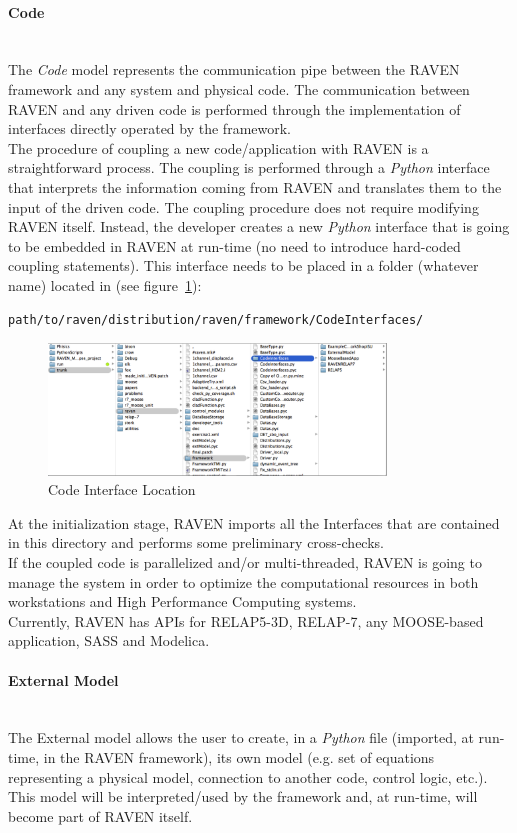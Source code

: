 \paragraph{Code} ~\\
The \textit{Code} model represents the communication pipe between the RAVEN framework and any system and physical code. The communication between RAVEN and any driven code is performed through the implementation of interfaces directly operated by the framework.
\\The procedure of coupling a new code/application with RAVEN is a straightforward process. The coupling is performed through a \textit{Python}  interface that interprets the information coming from RAVEN and translates them to the input of the driven code. The coupling procedure does not require modifying RAVEN itself. Instead, the developer creates a new \textit{Python} interface that is going to be embedded in RAVEN at run-time (no need to introduce hard-coded coupling statements).  This interface needs to be placed in a folder (whatever name) located in (see figure~\ref{fig:CodeInterfaceLocation}):
\begin{lstlisting}[language=bash]
 path/to/raven/distribution/raven/framework/CodeInterfaces/
\end{lstlisting}

\begin{figure}
  \centering
  \includegraphics[width=0.8\textwidth]  {pics/CodeInterfaceLocation.png}
  \caption{Code Interface Location}
  \label{fig:CodeInterfaceLocation}
\end{figure}
At the initialization stage, RAVEN imports all the Interfaces that are contained in this directory and performs some preliminary cross-checks.
\\ If the coupled code is parallelized and/or multi-threaded, RAVEN is going to manage the system in order to optimize the computational resources in both workstations and High Performance Computing systems.
\\Currently, RAVEN has APIs for RELAP5-3D, RELAP-7, any MOOSE-based application, SASS and Modelica.
\paragraph{External Model} ~\\
The External model allows the user to create, in a \textit{Python} file (imported, at run-time, in the RAVEN framework), its own model (e.g. set of equations representing a physical model, connection to another code, control logic, etc.). This model will be interpreted/used by the framework and, at run-time, will become part of RAVEN itself.
